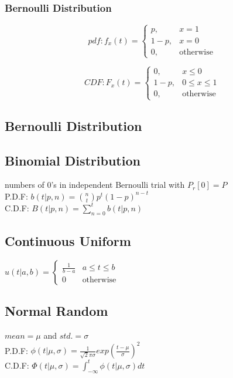 \documentclass{article}
\begin{document}
{        \subsubsection{Bernoulli Distribution}{
            \[pdf: f_x(t)= \begin{cases} 
                p, & x = 1 \\ 
                1-p, & x = 0 \\
                0, & \text{otherwise}
            \end{cases}\]

            \[CDF: F_x(t)= \begin{cases} 
                0, & x \leqslant 0 \\ 
                1-p, & 0 \leqslant x \leqslant 1 \\
                0, & \text{otherwise}
            \end{cases}\]
        }
    }
           
\subsection{Bernoulli Distribution}             	
	

\subsection{Binomial Distribution} 
	numbers of 0's in independent Bernoulli trial with $P_r[0]= P$
	\\P.D.F: $b(t| p, n)= {n \choose t}p^t (1-p)^{n-t}$
	\\C.D.F: $B(t| p, n)= \sum_{n=0}^t b(t| p, n)$
	
\subsection{Continuous Uniform} 		
	$ u(t| a, b)= \begin{cases} \frac{1}{b-a}  & a \le t \le b \\ 
	0& \text{otherwise} \end{cases}$
	
            
\subsection{Normal Random}             
	$mean= \mu $ and $std.= \sigma $
	\\P.D.F: $\phi(t| \mu, \sigma)= \frac{1}{\sqrt{2} \pi \sigma }exp(\frac{t-\mu}{\sigma})^2$
	\\C.D.F: $\Phi(t| \mu, \sigma)=  \int_{-\infty}^{t} \phi(t| \mu, \sigma)dt$
        
\end{document}
